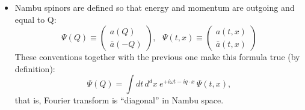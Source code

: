 \documentclass[a4paper,11pt, english]{article}
\theoremstyle{remark}
\begin{document}
\begin{itemize}
   
  \item Nambu spinors are defined so that energy and momentum are outgoing and equal to Q: 
   \begin{equation*}
    \Psi(Q)\equiv \begin{pmatrix}
           a(Q) \\
           \bar{a}(-Q)
          \end{pmatrix}, \ \ \ 
    \Psi(t,x)\equiv\begin{pmatrix}
		    a(t,x) \\
		    \bar{a}(t,x)
		    \end{pmatrix}
   \end{equation*}
   These conventions together with the previous one make this formula true (by definition):
   \begin{equation*}
    \Psi(Q)= \int dt\,d^dx\ e^{+i\omega t -iq\cdot x}\, \Psi(t,x),
   \end{equation*}
    that is, Fourier transform is ``diagonal'' in Nambu space.
    

\end{itemize}
\end{document}
